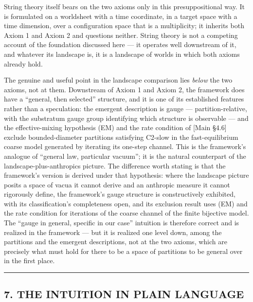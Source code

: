 \documentclass[
]{article}
\begin{document}
String theory itself bears on the two axioms only in this
presuppositional way. It is formulated on a worldsheet with a time
coordinate, in a target space with a time dimension, over a
configuration space that is a multiplicity; it inherits both Axiom 1 and
Axiom 2 and questions neither. String theory is not a competing account
of the foundation discussed here --- it operates well downstream of it,
and whatever its landscape is, it is a landscape of worlds in which both
axioms already hold.

The genuine and useful point in the landscape comparison lies
\emph{below} the two axioms, not at them. Downstream of Axiom 1 and
Axiom 2, the framework does have a ``general, then selected'' structure,
and it is one of its established features rather than a speculation: the
emergent description is gauge --- partition-relative, with the
substratum gauge group identifying which structure is observable --- and
the effective-mixing hypothesis (EM) and the rate condition of {[}Main
§4.6{]} exclude bounded-diameter partitions satisfying C2-slow in the
fast-equilibrium coarse model generated by iterating its one-step
channel. This is the framework's analogue of ``general law, particular
vacuum''; it is the natural counterpart of the landscape-plus-anthropics
picture. The difference worth stating is that the framework's version is
derived under that hypothesis: where the landscape picture posits a
space of vacua it cannot derive and an anthropic measure it cannot
rigorously define, the framework's gauge structure is constructively
exhibited, with its classification's completeness open, and its
exclusion result uses (EM) and the rate condition for iterations of the
coarse channel of the finite bijective model. The ``gauge in general,
specific in our case'' intuition is therefore correct and is realized in
the framework --- but it is realized one level down, among the
partitions and the emergent descriptions, not at the two axioms, which
are precisely what must hold for there to be a space of partitions to be
general over in the first place.

\begin{center}\rule{0.5\linewidth}{0.5pt}\end{center}

\hypertarget{the-intuition-in-plain-language}{%
\subsection{7. THE INTUITION IN PLAIN
LANGUAGE}\label{the-intuition-in-plain-language}}
\end{document}
